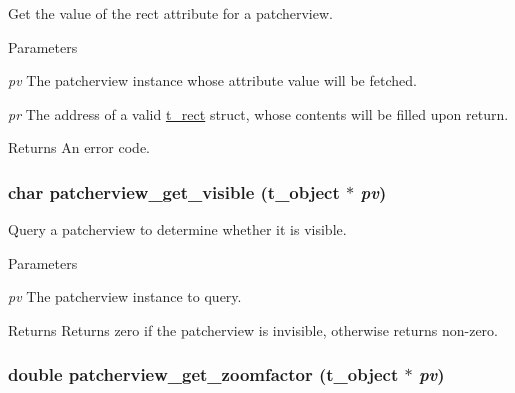Get the value of the rect attribute for a patcherview. 
\begin{DoxyParams}{Parameters}
\item[{\em pv}]The patcherview instance whose attribute value will be fetched. \item[{\em pr}]The address of a valid \hyperlink{structt__rect}{t\_\-rect} struct, whose contents will be filled upon return. \end{DoxyParams}
\begin{DoxyReturn}{Returns}
An error code. 
\end{DoxyReturn}
\hypertarget{group__jpatcherview_gaf9621ecabdae9fc9d865bd42a8bc43a9}{
\subsubsection[{patcherview\_\-get\_\-visible}]{\setlength{\rightskip}{0pt plus 5cm}char patcherview\_\-get\_\-visible ({\bf t\_\-object} $\ast$ {\em pv})}}
\label{group__jpatcherview_gaf9621ecabdae9fc9d865bd42a8bc43a9}


Query a patcherview to determine whether it is visible. 
\begin{DoxyParams}{Parameters}
\item[{\em pv}]The patcherview instance to query. \end{DoxyParams}
\begin{DoxyReturn}{Returns}
Returns zero if the patcherview is invisible, otherwise returns non-\/zero. 
\end{DoxyReturn}
\hypertarget{group__jpatcherview_ga3d82e2665c64f9c4452d1737c1429293}{
\subsubsection[{patcherview\_\-get\_\-zoomfactor}]{\setlength{\rightskip}{0pt plus 5cm}double patcherview\_\-get\_\-zoomfactor ({\bf t\_\-object} $\ast$ {\em pv})}}
\label{group__jpatcherview_ga3d82e2665c64f9c4452d1737c1429293}


